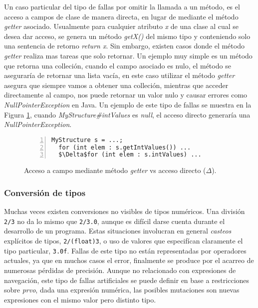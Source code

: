 Un caso particular del tipo de fallas por omitir la llamada a un m\'etodo, es el acceso a campos de clase de manera directa, en lugar de mediante el m\'etodo \emph{getter} asociado. Usualmente para cualquier atributo \emph{x} de una clase al cual se desea dar acceso, se genera un m\'etodo \emph{getX()} del mismo tipo y conteniendo solo una sentencia de retorno \emph{return x}. Sin embargo, existen casos donde el m\'etodo \emph{getter} realiza mas tareas que solo retornar. Un ejemplo muy simple es un m\'etodo que retorna una colleci\'on, cuando el campo asociado es nulo, el m\'etodo se asegurar\'ia de retornar una lista vac\'ia, en este caso utilizar el m\'etodo \emph{getter} asegura que siempre vamos a obtener una colleci\'on, mientras que acceder directamente al campo, nos puede retornar un valor nulo y causar errores como \emph{NullPointerException} en Java. Un ejemplo de este tipo de fallas se muestra en la Figura \ref{figures.examples.getterVsDirectAccess}, cuando \emph{MyStructure\#intValues} es \emph{null}, el acceso directo generar\'ia una \emph{NullPointerException}.

\begin{figure}
	\begin{lstlisting}[frame=single, numbers=left, mathescape=true,framexleftmargin=1.5em]
  MyStructure s = ...;
  for (int elem : s.getIntValues()) ...
  $\Delta$for (int elem : s.intValues) ...
	\end{lstlisting}
	\caption{Acceso a campo mediante m\'etodo \emph{getter} vs acceso directo ($\Delta$).}
	\label{figures.examples.getterVsDirectAccess}
\end{figure}

\subsubsection{Conversi\'on de tipos}

Muchas veces existen conversiones no visibles de tipos num\'ericos. Una divisi\'on \texttt{2/3} no da lo mismo que \texttt{2/3.0}, aunque es dif\'icil darse cuenta durante el desarrollo de un programa. Estas situaciones involucran en general \emph{casteos} expl\'icitos de tipos, \texttt{2/(float)3}, o uso de valores que especif\'ican claramente el tipo particular, \texttt{3.0f}. Fallas de este tipo no est\'an representadas por operadores actuales, ya que en muchos casos el error, finalmente se produce por el acarreo de numerosas p\'erdidas de precisi\'on. Aunque no relacionado con expresiones de navegaci\'on, este tipo de fallas artificiales se puede definir en base a restricciones sobre \emph{prvo}, dada una expresi\'on num\'erica, las posibles mutaciones son nuevas expresiones con el mismo valor pero distinto tipo.

